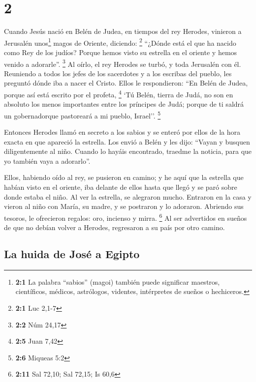 \hypertarget{section-1}{%
\section{2}\label{section-1}}

 Cuando Jesús nació en Belén de Judea, en tiempos del rey
Herodes, vinieron a Jerusalén unos\footnote{\textbf{2:1} La palabra
  ``sabios'' (magoi) también puede significar maestros, científicos,
  médicos, astrólogos, videntes, intérpretes de sueños o hechiceros.}
magos de Oriente, diciendo: \footnote{\textbf{2:1} Luc 2,1-7}
 ``¿Dónde está el que ha nacido como Rey de los judíos?
Porque hemos visto su estrella en el oriente y hemos venido a
adorarle''. \footnote{\textbf{2:2} Núm 24,17}  Al oírlo,
el rey Herodes se turbó, y toda Jerusalén con él. 
Reuniendo a todos los jefes de los sacerdotes y a los escribas del
pueblo, les preguntó dónde iba a nacer el Cristo.  Ellos
le respondieron: ``En Belén de Judea, porque así está escrito por el
profeta, \footnote{\textbf{2:5} Juan 7,42}  `Tú Belén,
tierra de Judá, no son en absoluto los menos importantes entre los
príncipes de Judá; porque de ti saldrá un gobernadorque pastoreará a mi
pueblo, Israel''. \footnote{\textbf{2:6} Miqueas 5:2}

 Entonces Herodes llamó en secreto a los sabios y se
enteró por ellos de la hora exacta en que apareció la estrella.
 Los envió a Belén y les dijo: ``Vayan y busquen
diligentemente al niño. Cuando lo hayáis encontrado, traedme la noticia,
para que yo también vaya a adorarlo''.

 Ellos, habiendo oído al rey, se pusieron en camino; y he
aquí que la estrella que habían visto en el oriente, iba delante de
ellos hasta que llegó y se paró sobre donde estaba el niño.
 Al ver la estrella, se alegraron mucho. 
Entraron en la casa y vieron al niño con María, su madre, y se postraron
y lo adoraron. Abriendo sus tesoros, le ofrecieron regalos: oro,
incienso y mirra. \footnote{\textbf{2:11} Sal 72,10; Sal 72,15; Is 60,6}
 Al ser advertidos en sueños de que no debían volver a
Herodes, regresaron a su país por otro camino.

\hypertarget{la-huida-de-josuxe9-a-egipto}{%
\subsection{La huida de José a
Egipto}\label{la-huida-de-josuxe9-a-egipto}}


